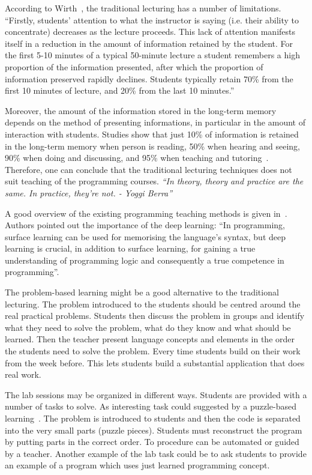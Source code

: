\documentclass{article}
\begin{document}
According to Wirth~\cite{wirth}, the traditional lecturing has a number of
limitations.  ``Firstly, students' attention to what the instructor is saying
(i.e. their ability to concentrate) decreases as the lecture proceeds. This lack
of attention manifests itself in a reduction in the amount of information
retained by the student. For the first 5-10 minutes of a typical 50-minute
lecture a student remembers a high proportion of the information presented,
after which the proportion of information preserved rapidly declines. Students
typically retain 70\% from the first 10 minutes of lecture, and 20\% from the
last 10 minutes.''

Moreover, the amount of the information stored in the long-term memory depends
on the method of presenting informations, in particular in the amount of
interaction with students.  Studies show that just 10\% of information  is
retained in the long-term memory when person is reading, 50\% when hearing and
seeing, 90\% when doing and discussing, and 95\% when teaching and
tutoring~\cite{magnesen}. Therefore, one can conclude that the traditional
lecturing techniques does not suit teaching of the programming courses.
\emph{``In theory, theory and practice are the same. In practice,
they’re not. - Yoggi Berra'' }



A good overview of the existing programming teaching methods is given
in~\cite{mohorovivcic2011overview}. Authors pointed out the importance
of the deep learning: ``In programming, surface learning can be used
for memorising the language’s syntax, but deep learning is crucial, in
addition to surface learning, for gaining a true understanding of
programming logic and consequently a true competence in
programming''.

The problem-based learning might be a good alternative to the
traditional lecturing.  The problem introduced to the students should
be centred around the real practical problems. Students then discuss
the problem in groups and identify what they need to solve the
problem, what do they know and what should be learned. Then the
teacher present language concepts and elements in the order the
students need to solve the problem. Every time students build
on their work from the week before. This lets students build a
substantial application that does real work.


The lab sessions may be organized in different ways. Students are
provided with a number of tasks to solve. As interesting task could
suggested by a puzzle-based
learning~\cite{mohorovivcic2011overview}. The problem is introduced to
students and then the code is separated into the very small parts
(puzzle pieces). Students must reconstruct the program by putting
parts in the correct order. To procedure can be automated or guided by
a teacher. Another example of the lab task could be to ask students to
provide an example of a program which uses just learned programming
concept.
\end{document}
